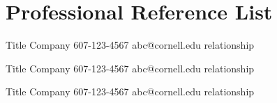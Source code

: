 \section{Professional Reference List}
\vspace*{0.1cm}

{Title}
{Company}
{607-123-4567}
{abc@cornell.edu}
{relationship}

{Title}
{Company}
{607-123-4567}
{abc@cornell.edu}
{relationship}

{Title}
{Company}
{607-123-4567}
{abc@cornell.edu}
{relationship}